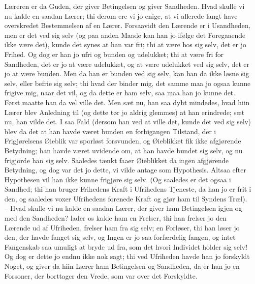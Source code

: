 \documentclass[12pt,a4paper]{article}
\begin{document}
Læreren er da Guden, der giver Betingelsen og giver Sandheden. Hvad skulle vi nu kalde en saadan Lærer; thi derom ere vi jo enige, at vi allerede langt have overskredet Bestemmelsen af en Lærer. Forsaavidt den Lærende er i Usandheden, men er det ved sig selv (og paa anden Maade kan han jo ifølge det Foregaaende ikke være det), kunde det synes at han var fri; thi at være hos sig selv, det er jo Frihed. Og dog er han jo ufri og bunden og udelukket; thi at være fri for Sandheden, det er jo at være udelukket, og at være udelukket ved sig selv, det er jo at være bunden. Men da han er bunden ved sig selv, kan han da ikke løsne sig selv, eller befrie sig selv; thi hvad der binder mig, det samme maa jo ogsaa kunne frigive mig, naar det vil, og da dette er ham selv, saa maa han jo kunne det. Først maatte han da vel ville det. Men sæt nu, han saa dybt mindedes, hvad hiin Lærer blev Anledning til (og dette tør jo aldrig glemmes) at han erindrede; sæt nu, han vilde det. I saa Fald (dersom han ved at ville det, kunde det ved sig selv) blev da det at han havde været bunden en forbigangen Tilstand, der i Frigjørelsens Øieblik var sporløst forsvunden, og Øieblikket fik ikke afgjørende Betydning; han havde været uvidende om, at han havde bundet sig selv, og nu frigjorde han sig selv. Saaledes tænkt faaer Øieblikket da ingen afgjørende Betydning, og dog var det jo dette, vi vilde antage som Hypothesis. Altsaa efter Hypothesen vil han ikke kunne frigjøre sig selv. (Og saaledes er det ogsaa i Sandhed; thi han bruger Frihedens Kraft i Ufrihedens Tjeneste, da han jo er frit i den, og saaledes voxer Ufrihedens forenede Kraft og gjør ham til Syndens Træl). – Hvad skulle vi nu kalde en saadan Lærer, der giver ham Betingelsen igjen og med den Sandheden? lader os kalde ham en Frelser, thi han frelser jo den Lærende ud af Ufriheden, frelser ham fra sig selv; en Forløser, thi han løser jo den, der havde fanget sig selv, og Ingen er jo saa forfærdelig fangen, og intet Fangenskab saa umuligt at bryde ud fra, som det hvori Individet holder sig selv! Og dog er dette jo endnu ikke nok sagt; thi ved Ufriheden havde han jo forskyldt Noget, og giver da hiin Lærer ham Betingelsen og Sandheden, da er han jo en Forsoner, der borttager den Vrede, som var over det Forskyldte.
\end{document}
